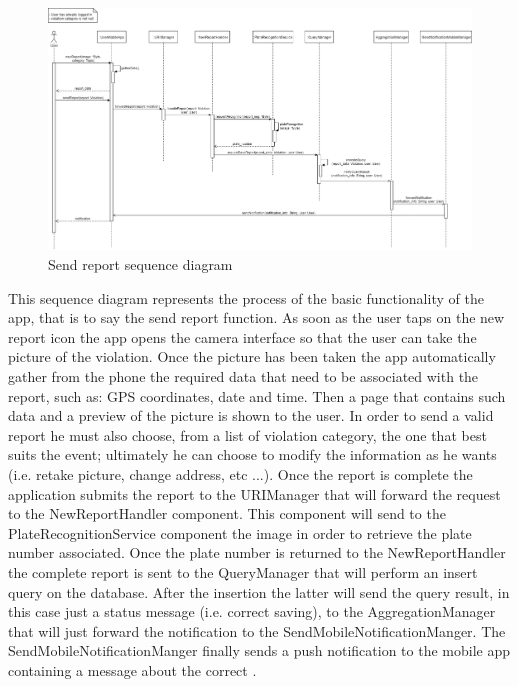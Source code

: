 \begin{figure}[H]
  \centering
  \includegraphics[width=1\textwidth]{Images/UML_diagrams/Sequence_Diagrams/Send_Report_sd.png}
  \caption{Send report sequence diagram}
  \label{fig:send_report_sd}
\end{figure}
This sequence diagram represents the process of the basic functionality of the app, that is to say the send report function. As soon as the user taps on the new report icon the app opens the camera interface so that the user can take the picture of the violation. Once the picture has been taken the app automatically gather from the phone the required data that need to be associated with the report, such as: GPS coordinates, date and time. Then a page that contains such data and a preview of the picture is shown to the user. In order to send a valid report he must also choose, from a list of violation category, the one that best suits the event; ultimately he can choose to modify the information as he wants (i.e. retake picture, change address, etc ...). Once the report is complete the application submits the report to the URIManager that will forward the request to the NewReportHandler component. This component will send to the PlateRecognitionService component the image in order to retrieve the plate number associated. Once the plate number is returned to the NewReportHandler the complete report is sent to the QueryManager that will perform an insert query on the database. After the insertion the latter will send the query result, in this case just a status message (i.e. correct saving), to the AggregationManager that will just forward the notification to the SendMobileNotificationManger. The SendMobileNotificationManger finally sends a push notification to the mobile app containing a message about the correct .
 